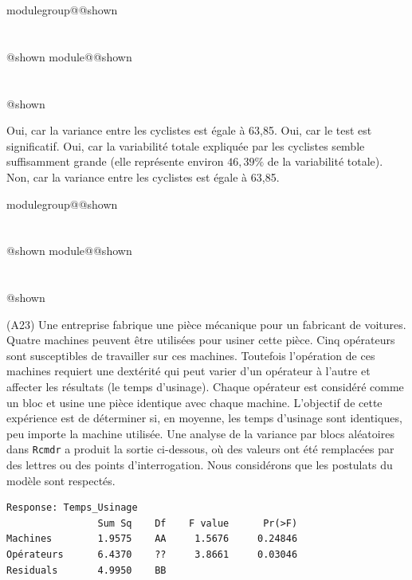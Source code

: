 \documentclass{Evaluation}
\makeatletter
\newcommand{\currentmodulekey}{}
\newcommand{\currentmoduletitle}{}
\newcommand{\currentgroupkey}{}
\newcommand{\currentgrouptitle}{}
\newcommand{\showmoduleifneeded}{%
  \ifx\currentgroupkey\empty\else
    \expandafter\ifx\csname modulegroup@\currentgroupkey @shown\endcsname\relax
      \section*{\currentgrouptitle}%
      \expandafter\gdef\csname modulegroup@\currentgroupkey @shown\endcsname{1}%
    \fi
  \fi
  \expandafter\ifx\csname module@\currentmodulekey @shown\endcsname\relax
    \section*{\currentmoduletitle}%
    \expandafter\gdef\csname module@\currentmodulekey @shown\endcsname{1}%
  \fi
}
\newenvironment{A23}{\showmoduleifneeded}{}
\makeatother
\begin{document}
\begin{questions}
\begin{A23}
\begin{checkboxes}
\choice Oui, car la variance entre les cyclistes est égale à 63,85.
\choice Oui, car le test est significatif.
\correctchoice Oui, car la variabilité totale expliquée par les cyclistes semble suffisamment grande (elle représente environ $46,39\%$ de la variabilité totale).
\choice Non, car la variance entre les cyclistes est égale à 63,85.
\end{checkboxes}

\end{A23}

\begin{A23}
\question
(A23) 
Une entreprise fabrique une pièce mécanique pour un fabricant de voitures. Quatre machines peuvent être utilisées pour usiner cette pièce. Cinq opérateurs sont susceptibles de travailler sur ces machines. Toutefois l'opération de ces machines requiert une  dextérité qui peut varier d'un opérateur à l'autre et affecter les résultats (le temps d'usinage). %
Chaque opérateur est considéré comme un bloc et usine une pièce identique avec chaque machine.
L'objectif de cette expérience est de déterminer si, en moyenne, les temps d'usinage sont identiques, peu importe la machine utilisée. Une analyse de la variance par blocs aléatoires dans \texttt{Rcmdr} a produit la sortie ci-dessous, où des valeurs ont été remplacées par des lettres ou des points d'interrogation. Nous considérons que les postulats 
 du modèle sont respectés.

\begin{verbatim}
Response: Temps_Usinage
                Sum Sq    Df    F value      Pr(>F)
Machines        1.9575    AA     1.5676     0.24846
Opérateurs      6.4370    ??     3.8661     0.03046 
Residuals       4.9950    BB
\end{verbatim}

\medskip

\end{A23}
\end{questions}
\end{document}

